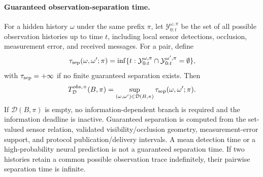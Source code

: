 \documentclass[letterpaper]{article} %
\begin{document}
\paragraph{Guaranteed observation-separation time.}
For a hidden history $\omega$ under the same prefix $\pi$, let $\mathcal Y_{0:t}^{\omega,\pi}$ be the set of all possible observation histories up to time $t$, including local sensor detections, occlusion, measurement error, and received messages. For a pair, define
\begin{equation}
\tau_{\rm sep}(\omega,\omega';\pi)=
\inf\{t:
\mathcal Y_{0:t}^{\omega,\pi}
\cap\mathcal Y_{0:t}^{\omega',\pi}=\emptyset\},
\label{eq:pair-separation}
\end{equation}
with $\tau_{\rm sep}=+\infty$ if no finite guaranteed separation exists. Then
\begin{equation}
T_{\mathcal D}^{obs,+}(B,\pi)=
\sup_{(\omega,\omega')\in\mathcal D(B,\pi)}
\tau_{\rm sep}(\omega,\omega';\pi).
\label{eq:obs-separation}
\end{equation}
If $\mathcal D(B,\pi)$ is empty, no information-dependent branch is required and the information deadline is inactive. Guaranteed separation is computed from the set-valued sensor relation, validated visibility/occlusion geometry, measurement-error support, and protocol publication/delivery intervals. A mean detection time or a high-probability neural prediction is not a guaranteed separation time. If two histories retain a common possible observation trace indefinitely, their pairwise separation time is infinite.
\end{document}
